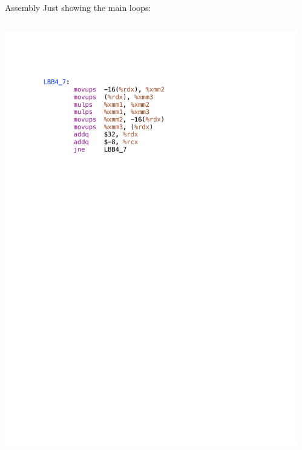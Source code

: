 \documentclass[presentation,t]{beamer}
\begin{document}
\begin{frame}{Assembly}
  Just showing the main loops:
  \begin{columns}
    \begin{column}{0.5\textwidth}
      \includegraphics[width=\textwidth]{looptests/cstyleO2.pdf}
    \end{column} 
    \begin{column}{0.5\textwidth}

\end{column}
\end{columns}
\end{frame}
\end{document}
